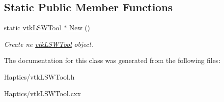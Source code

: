 \subsection*{Static Public Member Functions}
\begin{DoxyCompactItemize}
\item 
\hypertarget{classvtkLSWTool_a52925ce9f94d194f51fbcff8c3655db5}{
static \hyperlink{classvtkLSWTool}{vtkLSWTool} $\ast$ \hyperlink{classvtkLSWTool_a52925ce9f94d194f51fbcff8c3655db5}{New} ()}
\label{classvtkLSWTool_a52925ce9f94d194f51fbcff8c3655db5}

\begin{DoxyCompactList}\small\item\em Create ne \hyperlink{classvtkLSWTool}{vtkLSWTool} object. \item\end{DoxyCompactList}\end{DoxyCompactItemize}


The documentation for this class was generated from the following files:\begin{DoxyCompactItemize}
\item 
Haptics/vtkLSWTool.h\item 
Haptics/vtkLSWTool.cxx\end{DoxyCompactItemize}

